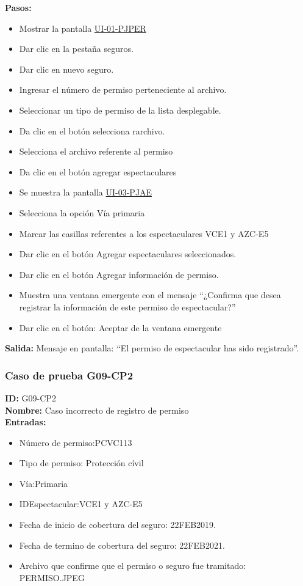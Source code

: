\textbf{Pasos:}
\begin{itemize}
    \item Mostrar la pantalla \hyperlink{IU:UI-01-PJPER}{UI-01-PJPER}
    \item Dar clic en la pestaña seguros.
    \item Dar clic en nuevo seguro.
    \item Ingresar el número de permiso perteneciente al archivo.
    \item Seleccionar un tipo de permiso de la lista desplegable.
    \item Da clic en el botón selecciona rarchivo.
    \item Selecciona el archivo referente al permiso
    \item Da clic en el botón agregar espectaculares
    \item Se muestra la pantalla  \hyperlink{IU:UI-03-PJAE}{UI-03-PJAE}
    \item Selecciona la opción Vía primaria
    \item Marcar las casillas referentes a los espectaculares VCE1 y AZC-E5
    \item Dar clic en el botón Agregar espectaculares seleccionados.
    \item Dar clic en el botón Agregar información de permiso.
    \item Muestra una ventana emergente con el mensaje ``¿Confirma que desea registrar la información de este permiso de espectacular?''
    \item Dar clic en el botón: Aceptar de la ventana emergente
\end{itemize}
\textbf{Salida:}
Mensaje en pantalla: ``El permiso de espectacular has sido registrado''.


\subsubsection{Caso de prueba G09-CP2}
\textbf{ID:} G09-CP2\\
\textbf{Nombre:} Caso incorrecto de registro de permiso\\
\textbf{Entradas:}
\begin{itemize}
    \item Número de permiso:PCVC113
    \item Tipo de permiso: Protección cívil
    \item Vía:Primaria 
	\item IDEspectacular:VCE1 y AZC-E5
	\item Fecha de inicio de cobertura del seguro: 22FEB2019.
	\item Fecha de termino de cobertura del seguro: 22FEB2021.
	\item Archivo que confirme que el permiso o seguro fue tramitado: PERMISO.JPEG
\end{itemize}

